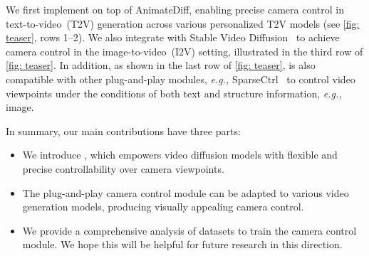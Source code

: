 We first implement \method on top of AnimateDiff, enabling precise camera control in text-to-video~(T2V) generation across various personalized T2V models (see \cref{fig: teaser}, rows 1--2).
%
We also integrate \method with Stable Video Diffusion~\citep{svd} to achieve camera control in the image-to-video~(I2V) setting, illustrated in the third row of \cref{fig: teaser}.
%
In addition, as shown in the last row of \cref{fig: teaser}, \method is also compatible with other plug-and-play modules, \emph{e.g.,} SparseCtrl~\citep{sparsectrl} to control video viewpoints under the conditions of both text and structure information, \emph{e.g.,} image. 

In summary, our main contributions have three parts:
\begin{itemize}
    \item We introduce \method, which empowers video diffusion models with flexible and precise controllability over camera viewpoints.
    \item The plug-and-play camera control module can be adapted to various video generation models, producing visually appealing camera control.
    \item We provide a comprehensive analysis of datasets to train the camera control module. We hope this will be helpful for future research in this direction.
\end{itemize}